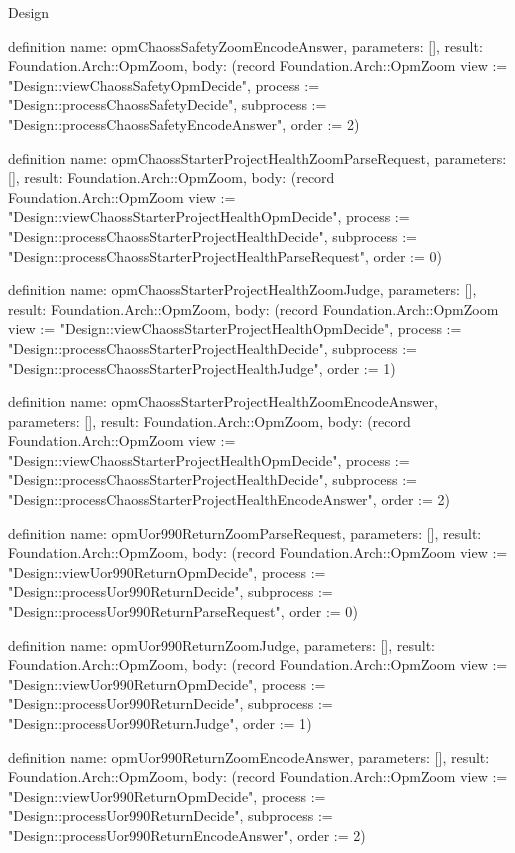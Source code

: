 \begin{lexlean}{Design}
\begin{semanticmodule}
definition{
  name: opmChaossSafetyZoomEncodeAnswer,
  parameters: [],
  result: Foundation.Arch::OpmZoom,
  body: (record Foundation.Arch::OpmZoom {view := "Design::viewChaossSafetyOpmDecide", process := "Design::processChaossSafetyDecide", subprocess := "Design::processChaossSafetyEncodeAnswer", order := 2})
}

definition{
  name: opmChaossStarterProjectHealthZoomParseRequest,
  parameters: [],
  result: Foundation.Arch::OpmZoom,
  body: (record Foundation.Arch::OpmZoom {view := "Design::viewChaossStarterProjectHealthOpmDecide", process := "Design::processChaossStarterProjectHealthDecide", subprocess := "Design::processChaossStarterProjectHealthParseRequest", order := 0})
}

definition{
  name: opmChaossStarterProjectHealthZoomJudge,
  parameters: [],
  result: Foundation.Arch::OpmZoom,
  body: (record Foundation.Arch::OpmZoom {view := "Design::viewChaossStarterProjectHealthOpmDecide", process := "Design::processChaossStarterProjectHealthDecide", subprocess := "Design::processChaossStarterProjectHealthJudge", order := 1})
}

definition{
  name: opmChaossStarterProjectHealthZoomEncodeAnswer,
  parameters: [],
  result: Foundation.Arch::OpmZoom,
  body: (record Foundation.Arch::OpmZoom {view := "Design::viewChaossStarterProjectHealthOpmDecide", process := "Design::processChaossStarterProjectHealthDecide", subprocess := "Design::processChaossStarterProjectHealthEncodeAnswer", order := 2})
}

definition{
  name: opmUor990ReturnZoomParseRequest,
  parameters: [],
  result: Foundation.Arch::OpmZoom,
  body: (record Foundation.Arch::OpmZoom {view := "Design::viewUor990ReturnOpmDecide", process := "Design::processUor990ReturnDecide", subprocess := "Design::processUor990ReturnParseRequest", order := 0})
}

definition{
  name: opmUor990ReturnZoomJudge,
  parameters: [],
  result: Foundation.Arch::OpmZoom,
  body: (record Foundation.Arch::OpmZoom {view := "Design::viewUor990ReturnOpmDecide", process := "Design::processUor990ReturnDecide", subprocess := "Design::processUor990ReturnJudge", order := 1})
}

definition{
  name: opmUor990ReturnZoomEncodeAnswer,
  parameters: [],
  result: Foundation.Arch::OpmZoom,
  body: (record Foundation.Arch::OpmZoom {view := "Design::viewUor990ReturnOpmDecide", process := "Design::processUor990ReturnDecide", subprocess := "Design::processUor990ReturnEncodeAnswer", order := 2})
}


\end{semanticmodule}
\end{lexlean}
